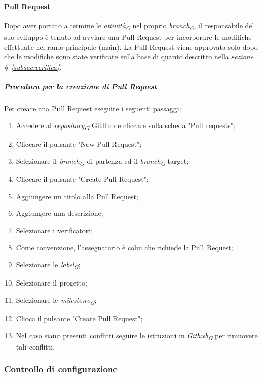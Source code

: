 \paragraph{Pull Request}
Dopo aver portato a termine le \textit{attività}\textsubscript{\textit{G}} nel proprio \textit{branch}\textsubscript{\textit{G}}, il responsabile del suo sviluppo è tenuto ad avviare una Pull Request per incorporare le modifiche effettuate nel ramo principale (main). La Pull Request viene approvata solo dopo che le modifiche sono state verificate sulla base di quanto descritto nella \textit{sezione \S~\ref{subsec:verifica}}.

\hypertarget{par:creazionePR}{\subparagraph{Procedura per la creazione di Pull Request}}
Per creare una Pull Request eseguire i seguenti passaggi:
\begin{enumerate}
    \item Accedere al \textit{repository}\textsubscript{\textit{G}} GitHub e cliccare sulla scheda "Pull requests";
    \item Cliccare il pulsante "New Pull Request";
    \item Selezionare il \textit{branch}\textsubscript{\textit{G}} di partenza ed il \textit{branch}\textsubscript{\textit{G}} target;
    \item Cliccare il pulsante "Create Pull Request";
    \item Aggiungere un titolo alla Pull Request;
    \item Aggiungere una descrizione;
    \item Selezionare i verificatori;
    \item Come convenzione, l'assegnatario è colui che richiede la Pull Request;
    \item Selezionare le \textit{label}\textsubscript{\textit{G}};
    \item Selezionare il progetto;
    \item Selezionare le \textit{milestone}\textsubscript{\textit{G}};
    \item Clicca il pulsante "Create Pull Request";
    \item Nel caso siano presenti conflitti seguire le istruzioni in \textit{Github}\textsubscript{\textit{G}} per rimuovere tali conflitti.
\end{enumerate}

\subsubsection{Controllo di configurazione}
